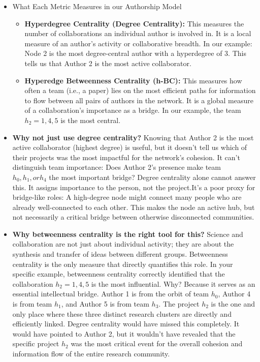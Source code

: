 \documentclass[10pt, a4paper]{article}
\begin{document}
\begin{itemize}
    \item What Each Metric Measures in our Authorship Model
    \begin{itemize}
    \item \textbf{Hyperdegree Centrality (Degree Centrality):}
This measures the number of collaborations an individual author is involved in. It is a local measure of an author's activity or collaborative breadth. In our example:
Node 2 is the most degree-central author with a hyperdegree of 3.
This tells us that Author 2 is the most active collaborator.
    \item \textbf{Hyperedge Betweenness Centrality (h-BC):}
This measures how often a team (i.e., a paper) lies on the most efficient paths for information to flow between all pairs of authors in the network. It is a global measure of a collaboration's importance as a bridge. In our example, the team $h_2=1,4,5$ is the most central.
\end{itemize}
    \item \textbf{Why not just use degree centrality?}
Knowing that Author 2 is the most active collaborator (highest degree) is useful, but it doesn't tell us which of their projects was the most impactful for the network's cohesion. It can't distinguish team importance: Does Author 2's presence make team $h_0, h_1, or  h_4$ the most important bridge? Degree centrality alone cannot answer this. It assigns importance to the person, not the project.It's a poor proxy for bridge-like roles: A high-degree node might connect many people who are already well-connected to each other. This makes the node an active hub, but not necessarily a critical bridge between otherwise disconnected communities.
    \item \textbf{Why betweenness centrality is the right tool for this?}
Science and collaboration are not just about individual activity; they are about the synthesis and transfer of ideas between different groups. Betweenness centrality is the only measure that directly quantifies this role.
In your specific example, betweenness centrality correctly identified that the collaboration $h_2=1,4,5$ is the most influential. Why? Because it serves as an essential intellectual bridge. Author 1 is from the orbit of team $h_0$, Author 4 is from team $h_1$, and Author 5 is from team $h_3$.
The project $h_2$ is the one and only place where these three distinct research clusters are directly and efficiently linked.
Degree centrality would have missed this completely. It would have pointed to Author 2, but it wouldn't have revealed that the specific project $h_2$ was the most critical event for the overall cohesion and information flow of the entire research community.

\end{itemize}
\end{document}
